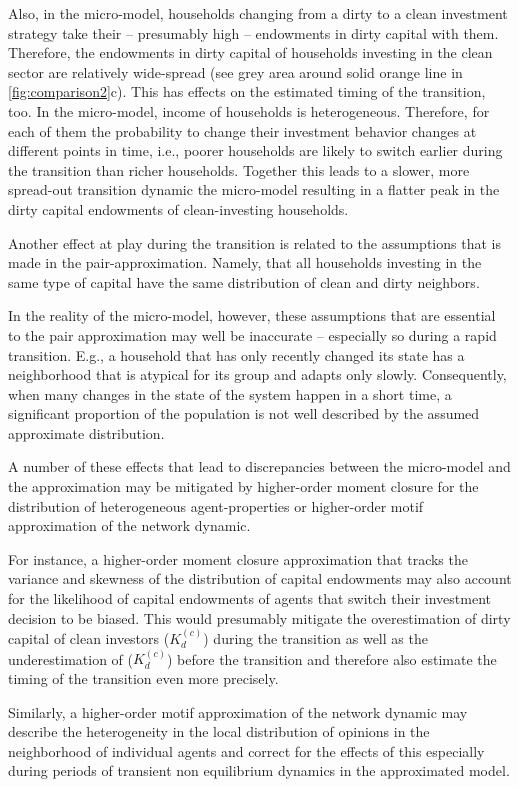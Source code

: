 Also, in the micro-model, households changing from a dirty to a clean investment strategy take their -- presumably high -- endowments in dirty capital with them. Therefore, the endowments in dirty capital of households investing in the clean sector are relatively wide-spread (see grey area around solid orange line in \cref{fig:comparison2}c). 
This has effects on the estimated timing of the transition, too. In the micro-model, income of households is heterogeneous. Therefore, for each of them the probability to change their investment behavior changes at different points in time, i.e., poorer households are likely to switch earlier during the transition than richer households. Together this leads to a slower, more spread-out transition dynamic the micro-model resulting in a flatter peak in the dirty capital endowments of clean-investing households.

Another effect at play during the transition is related to the assumptions that is made in the pair-approximation. Namely, that all households investing in the same type of capital have the same distribution of clean and dirty neighbors.

In the reality of the micro-model, however, these assumptions that are essential to the pair approximation may well be inaccurate -- especially so during a rapid transition. E.g., a household that has only recently changed its state has a neighborhood that is atypical for its group and adapts only slowly. Consequently, when many changes in the state of the system happen in a short time, a significant proportion of the population is not well described by the assumed approximate distribution.

A number of these effects that lead to discrepancies between the micro-model and the approximation may be mitigated by higher-order moment closure for the distribution of heterogeneous agent-properties or higher-order motif approximation of the network dynamic.

For instance, a higher-order moment closure approximation that tracks the variance and skewness of the distribution of capital endowments may also account for the likelihood of capital endowments of agents that switch their investment decision to be biased. This would presumably mitigate the overestimation of dirty capital of clean investors ($K_d^{(c)}$) during the transition as well as the underestimation of ($K_d^{(c)}$) before the transition and therefore also estimate the timing of the transition even more precisely. 

Similarly, a higher-order motif approximation of the network dynamic may describe the heterogeneity in the local distribution of opinions in the neighborhood of individual agents and correct for the effects of this especially during periods of transient non equilibrium dynamics in the approximated model.\\

